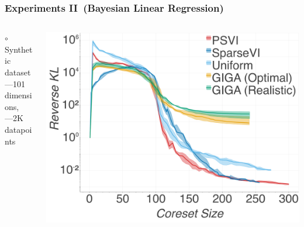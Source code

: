 \documentclass[hyperref={colorlinks = true},unknownkeysallowed]{beamer}
\begin{document}
\begin{frame}
	\frametitle{Experiments II~(Bayesian Linear Regression)}
	\centering
	\begin{columns}
		\begin{column}{.5\textwidth}
		$\circ$ Synthetic dataset
		\\---101 dimensions,
		\\---2K datapoints
		\end{column}
		\begin{column}{.5\textwidth}
		\includegraphics[width=1.\textwidth]{figs/linregKLDvsCstSize.png}
		\end{column}
	\end{columns}
\end{frame}
\end{document}
